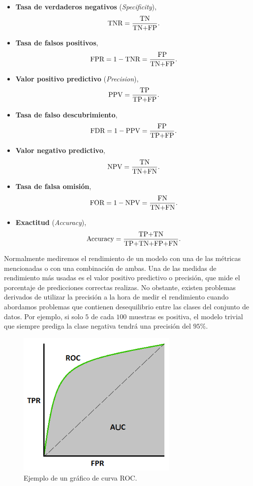 \documentclass[oneside,openright,titlepage,numbers=noenddot,openany,headinclude,footinclude=true,
cleardoublepage=empty,abstractoff,BCOR=5mm,paper=a4,fontsize=12pt,main=spanish]{scrreprt}
\begin{document}
\begin{itemize}
    \item \textbf{Tasa de verdaderos negativos} (\textit{Specificity}), $$\text{TNR}=\frac{\displaystyle \text{TN}}{\displaystyle \text{TN+FP}}.$$
    \item \textbf{Tasa de falsos positivos}, $$\text{FPR}=1-\text{TNR}=\frac{\displaystyle \text{FP}}{\displaystyle \text{TN+FP}}.$$
    \item \textbf{Valor positivo predictivo} (\textit{Precision}),  $$\text{PPV}=\frac{\displaystyle \text{TP}}{\displaystyle \text{TP+FP}}.$$
    \item \textbf{Tasa de falso descubrimiento}, $$\text{FDR}=1-\text{PPV}=\frac{\displaystyle \text{FP}}{\displaystyle \text{TP+FP}}.$$
    \item \textbf{Valor negativo predictivo}, $$\text{NPV}=\frac{\displaystyle \text{TN}}{\displaystyle \text{TN+FN}}.$$
    \item \textbf{Tasa de falsa omisión}, $$\text{FOR}=1-\text{NPV}=\frac{\displaystyle \text{FN}}{\displaystyle \text{TN+FN}}.$$
    \item \textbf{Exactitud} (\textit{Accuracy}), $$\text{Accuracy}=\frac{\displaystyle \text{TP+TN}}{\displaystyle \text{TP+TN+FP+FN}}.$$
\end{itemize}

\clearpage

Normalmente mediremos el rendimiento de un modelo con una de las métricas mencionadas o con una combinación de ambas. Una de las medidas de rendimiento más usadas es el valor positivo predictivo o precisión, que mide el porcentaje de predicciones correctas realizas. No obstante, existen problemas derivados de utilizar la precisión a la hora de medir el rendimiento cuando abordamos problemas que contienen desequilibrio entre las clases del conjunto de datos. Por ejemplo, si solo $5$ de cada $100$ muestras es positiva, el modelo trivial que siempre prediga la clase negativa tendrá una precisión del $95\%$.\\

\begin{figure}[h]
	\centering
	\includegraphics[width=7.8cm]{ROC_curve.png}
	\caption{Ejemplo de un gráfico de curva ROC.}
    \label{fig:curvaROC}
\end{figure}
\end{document}
